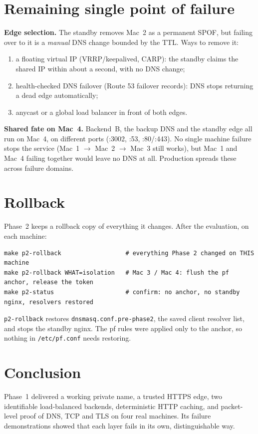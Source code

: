 \documentclass[11pt,a4paper]{article}
\begin{document}
\section{Remaining single point of failure}
\textbf{Edge selection.} The standby removes Mac~2 as a permanent SPOF, but failing over to it is a
\emph{manual} DNS change bounded by the TTL. Ways to remove it:
\begin{enumerate}
  \item a floating virtual IP (VRRP/keepalived, CARP): the standby claims the shared IP within about a second, with no DNS change;
  \item health-checked DNS failover (Route 53 failover records): DNS stops returning a dead edge automatically;
  \item anycast or a global load balancer in front of both edges.
\end{enumerate}

\textbf{Shared fate on Mac~4.} Backend~B, the backup DNS and the standby edge all run on Mac~4, on
different ports (:3002, :53, :80/:443). No single machine failure stops the service
(Mac~1 $\to$ Mac~2 $\to$ Mac~3 still works), but Mac~1 and Mac~4 failing together would leave no DNS
at all. Production spreads these across failure domains.

\section{Rollback}
Phase~2 keeps a rollback copy of everything it changes. After the evaluation, on each machine:
\par\noindent\begin{minipage}{\linewidth}
\begin{lstlisting}
make p2-rollback                  # everything Phase 2 changed on THIS machine
make p2-rollback WHAT=isolation   # Mac 3 / Mac 4: flush the pf anchor, release the token
make p2-status                    # confirm: no anchor, no standby nginx, resolvers restored
\end{lstlisting}
\end{minipage}\par
\texttt{p2-rollback} restores \texttt{dnsmasq.conf.pre-phase2}, the saved client resolver list, and
stops the standby nginx. The pf rules were applied only to the anchor, so nothing in
\texttt{/etc/pf.conf} needs restoring.

\section{Conclusion}
Phase~1 delivered a working private name, a trusted HTTPS edge, two identifiable load-balanced
backends, deterministic HTTP caching, and packet-level proof of DNS, TCP and TLS on four real
machines. Its failure demonstrations showed that each layer fails in its own, distinguishable way.
\end{document}
